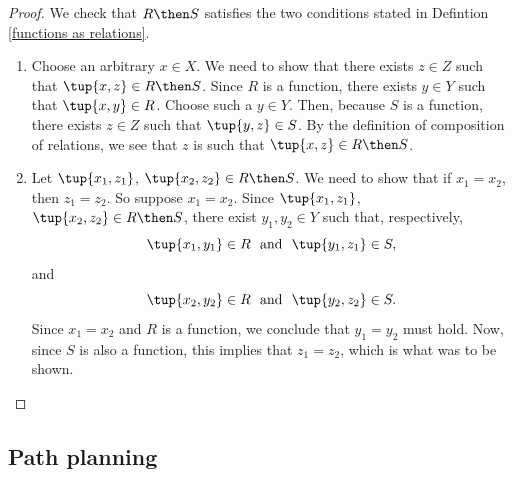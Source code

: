 \begin{proof}
We check that $R \then S$ satisfies the two conditions stated in Defintion \ref{functions as relations}. 

\begin{enumerate}
\item Choose an arbitrary $x \in X$. We need to show that there exists $z \in Z$ such that $\tup{x,z} \in R \then S$.  Since $R$ is a function, there exists $y \in Y$ such that $\tup{x,y} \in R$. Choose such a $y \in Y$. Then, because $S$ is a function, there exists $z \in Z$ such that $\tup{y,z} \in S$. By the definition of composition of relations, we see that $z$ is such that $\tup{x,z} \in R \then S$. 
\item Let $\tup{x_1, z_1}$, $\tup{x_2,z_2} \in R \then S$. We need to show that if $x_1 = x_2$, then $z_1 = z_2$. So suppose $x_1 = x_2$. Since $\tup{x_1, z_1}$, $\tup{x_2,z_2} \in R \then S$, there exist $y_1, y_2 \in Y$ such that, respectively, 
$$
\tup{x_1, y_1} \in R \ \text{ and } \ \tup{y_1, z_1} \in S, 
$$
and
$$
\tup{x_2, y_2} \in R \ \text{ and } \ \tup{y_2, z_2} \in S.
$$
Since $x_1 = x_2$ and $R$ is a function, we conclude that $y_1 = y_2$ must hold. Now, since $S$ is also a function, this implies that $z_1 = z_2$, which is what was to be shown. 
\end{enumerate}
\end{proof}


%
%
%
%
%
%
%
%
%


\subsection{Path planning}
\label{sec:trekking}



